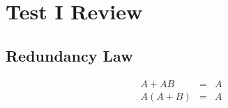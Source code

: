 \documentclass{article}
\begin{document}
\section{Test I Review}

\subsection{Redundancy Law}
\begin{eqnarray}
A + A B & = & A \\
A (A + B) & = & A
\end{eqnarray}
\end{document}
